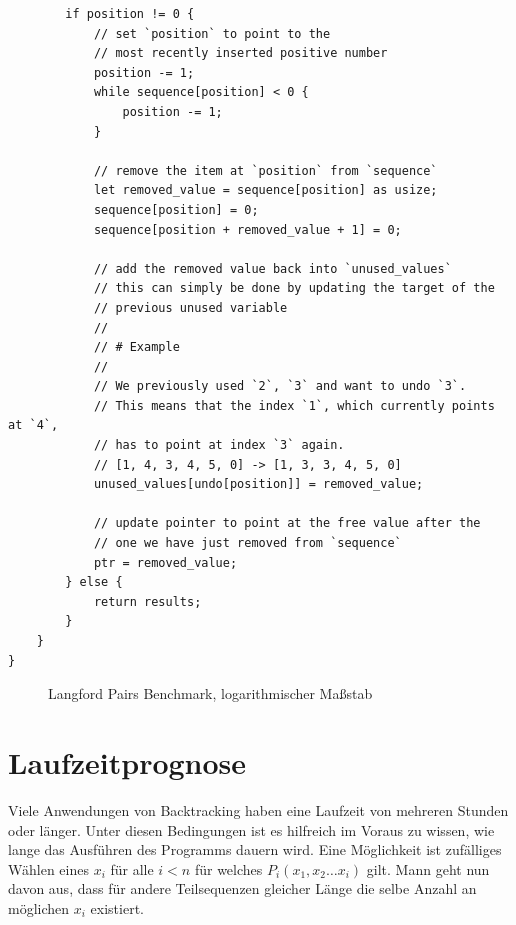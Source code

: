 \begin{verbatim}
        if position != 0 {
            // set `position` to point to the
            // most recently inserted positive number
            position -= 1;
            while sequence[position] < 0 {
                position -= 1;
            }

            // remove the item at `position` from `sequence`
            let removed_value = sequence[position] as usize;
            sequence[position] = 0;
            sequence[position + removed_value + 1] = 0;

            // add the removed value back into `unused_values`
            // this can simply be done by updating the target of the
            // previous unused variable
            //
            // # Example
            //
            // We previously used `2`, `3` and want to undo `3`.
            // This means that the index `1`, which currently points at `4`,
            // has to point at index `3` again.
            // [1, 4, 3, 4, 5, 0] -> [1, 3, 3, 4, 5, 0]
            unused_values[undo[position]] = removed_value;

            // update pointer to point at the free value after the 
            // one we have just removed from `sequence`
            ptr = removed_value;
        } else {
            return results;
        }
    }
}
\end{verbatim}
\begin{figure}
  \centering
  
  \caption{Langford Pairs Benchmark, logarithmischer Maßstab }
\end{figure}
\chapter{Laufzeitprognose}

Viele Anwendungen von Backtracking haben eine Laufzeit von mehreren Stunden oder länger.
Unter diesen Bedingungen ist es hilfreich im Voraus zu wissen, wie lange das Ausführen
des Programms dauern wird. Eine Möglichkeit ist zufälliges Wählen eines $x_{i}$ für alle $i < n$ für welches
$P_{i}(x_{1}, x_{2} \dots x_{i})$ gilt. Mann geht nun davon aus,
dass für andere Teilsequenzen gleicher Länge die selbe Anzahl an möglichen $x_{i}$ existiert.

